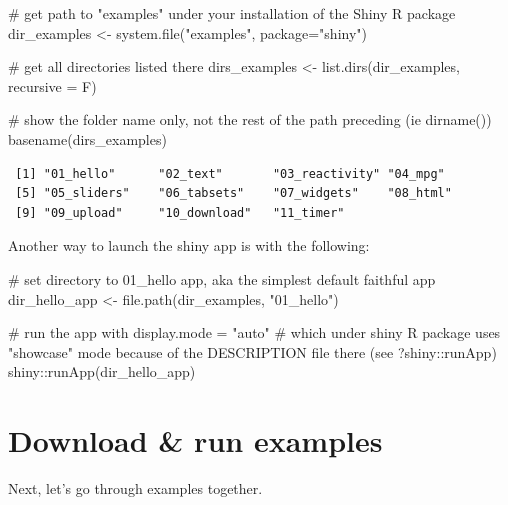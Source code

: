\documentclass[
  letterpaper,
  DIV=11,
  numbers=noendperiod]{scrreprt}
\newenvironment{Shaded}{\begin{snugshade}}{\end{snugshade}}
\newcommand{\AttributeTok}[1]{\textcolor[rgb]{0.40,0.45,0.13}{#1}}
\newcommand{\CommentTok}[1]{\textcolor[rgb]{0.37,0.37,0.37}{#1}}
\newcommand{\FunctionTok}[1]{\textcolor[rgb]{0.28,0.35,0.67}{#1}}
\newcommand{\NormalTok}[1]{\textcolor[rgb]{0.00,0.23,0.31}{#1}}
\newcommand{\OtherTok}[1]{\textcolor[rgb]{0.00,0.23,0.31}{#1}}
\newcommand{\SpecialCharTok}[1]{\textcolor[rgb]{0.37,0.37,0.37}{#1}}
\newcommand{\StringTok}[1]{\textcolor[rgb]{0.13,0.47,0.30}{#1}}
\begin{document}
\begin{Shaded}
\begin{Highlighting}[]
\CommentTok{\# get path to "examples" under your installation of the Shiny R package}
\NormalTok{dir\_examples  }\OtherTok{\textless{}{-}} \FunctionTok{system.file}\NormalTok{(}\StringTok{"examples"}\NormalTok{, }\AttributeTok{package=}\StringTok{"shiny"}\NormalTok{)}

\CommentTok{\# get all directories listed there}
\NormalTok{dirs\_examples }\OtherTok{\textless{}{-}} \FunctionTok{list.dirs}\NormalTok{(dir\_examples, }\AttributeTok{recursive =}\NormalTok{ F)}

\CommentTok{\# show the folder name only, not the rest of the path preceding (ie dirname())}
\FunctionTok{basename}\NormalTok{(dirs\_examples)}
\end{Highlighting}
\end{Shaded}

\begin{verbatim}
 [1] "01_hello"      "02_text"       "03_reactivity" "04_mpg"       
 [5] "05_sliders"    "06_tabsets"    "07_widgets"    "08_html"      
 [9] "09_upload"     "10_download"   "11_timer"     
\end{verbatim}

Another way to launch the shiny app is with the following:

\begin{Shaded}
\begin{Highlighting}[]
\CommentTok{\# set directory to 01\_hello app, aka the simplest default faithful app}
\NormalTok{dir\_hello\_app }\OtherTok{\textless{}{-}} \FunctionTok{file.path}\NormalTok{(dir\_examples, }\StringTok{"01\_hello"}\NormalTok{)}

\CommentTok{\# run the app with display.mode = "auto"}
\CommentTok{\#   which under shiny R package uses "showcase" mode because of the DESCRIPTION  file there (see ?shiny::runApp)}
\NormalTok{shiny}\SpecialCharTok{::}\FunctionTok{runApp}\NormalTok{(dir\_hello\_app)}
\end{Highlighting}
\end{Shaded}

\hypertarget{download-run-examples}{%
\section{Download \& run examples}\label{download-run-examples}}

Next, let's go through examples together.
\end{document}
